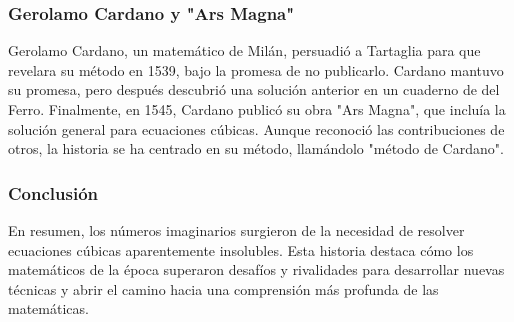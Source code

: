 \documentclass{beamer}
\begin{document}
\begin{frame}
\frametitle{Gerolamo Cardano y "Ars Magna"}
Gerolamo Cardano, un matemático de Milán, persuadió a Tartaglia para que revelara su método en 1539, bajo la promesa de no publicarlo. Cardano mantuvo su promesa, pero después descubrió una solución anterior en un cuaderno de del Ferro. Finalmente, en 1545, Cardano publicó su obra "Ars Magna", que incluía la solución general para ecuaciones cúbicas. Aunque reconoció las contribuciones de otros, la historia se ha centrado en su método, llamándolo "método de Cardano".
\end{frame}

\begin{frame}
\frametitle{Conclusión}
En resumen, los números imaginarios surgieron de la necesidad de resolver ecuaciones cúbicas aparentemente insolubles. Esta historia destaca cómo los matemáticos de la época superaron desafíos y rivalidades para desarrollar nuevas técnicas y abrir el camino hacia una comprensión más profunda de las matemáticas.
\end{frame}
\end{document}

